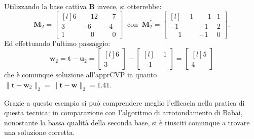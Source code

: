 \begin{exmp}
Utilizzando la base cattiva $\mathbf{B}$ invece, si otterrebbe:
\begin{equation*}
    \mathbf{M}_2 =
    \begin{bmatrix*}[l]
        6 & \phantom{-}12 & \phantom{-}7\\
        3 & -6           & -4\\
        1 & \phantom{-}0 & \phantom{-}0
    \end{bmatrix*}
    \ \text{ con } \
    \mathbf{M}_2^* =
    \begin{bmatrix*}[l]
        \phantom{-}1 & \phantom{-}1 & 1\\
        -1           & -1           & 2\\
        \phantom{-}1 & -1           & 0
    \end{bmatrix*}.
\end{equation*}
Ed effettuando l'ultimo passaggio:
\begin{equation*}
    \mathbf{w}_2 = \mathbf{t} - \mathbf{u}_2 =
    \begin{bmatrix*}[l]
        6 \\
        3
    \end{bmatrix*}
    -
    \begin{bmatrix*}[l]
        \phantom{-}1 \\
        -1
    \end{bmatrix*}
    =
    \begin{bmatrix*}[l]
        5 \\
        4
    \end{bmatrix*}
\end{equation*}
che è comunque soluzione all'apprCVP in quanto 
$\|\mathbf{t}-\mathbf{w}_2\|_2=\|\mathbf{t}-\mathbf{w}\|_2=1.41$.
\end{exmp}
Grazie a questo esempio si può comprendere meglio l'efficacia nella pratica di questa tecnica:
in comparazione con l'algoritmo di arrotondamento di Babai, nonostante la bassa qualità
della seconda base, si è riusciti comunque a trovare una soluzione corretta.



